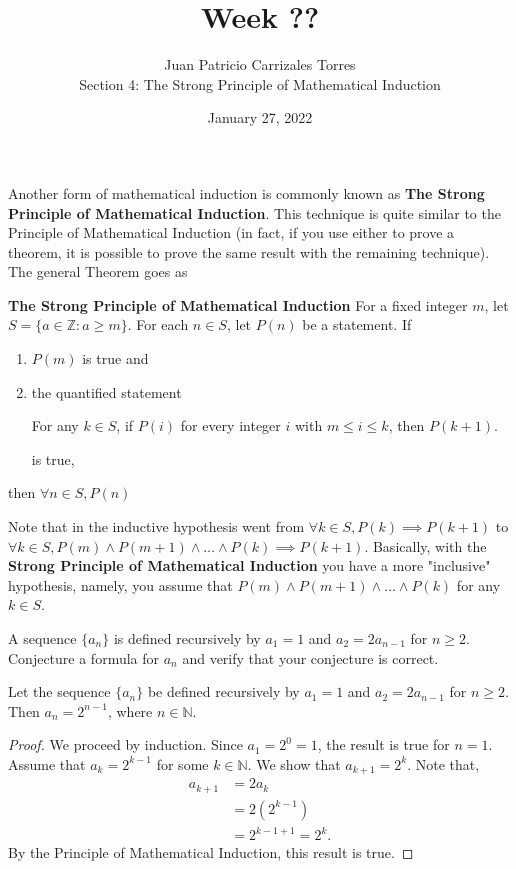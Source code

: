 \documentclass[12pt]{article}
\newcommand{\N}{\mathbb{N}}
\newcommand{\Z}{\mathbb{Z}}
\newenvironment{theorem}[2][Theorem]{\begin{trivlist}
		\item[\hskip \labelsep {\bfseries #1}\hskip \labelsep {\bfseries #2.}]}{\end{trivlist}}
\newenvironment{result}[2][Result]{\begin{trivlist}
			\item[\hskip \labelsep {\bfseries #1}\hskip \labelsep {\bfseries #2.}]}{\end{trivlist}}
\newenvironment{problem}[2][Problem]{\begin{trivlist}
		\item[\hskip \labelsep {\bfseries #1}\hskip \labelsep {\bfseries #2.}]}{\end{trivlist}}
\begin{document}
	
	\title{Week ??}
	\author{Juan Patricio Carrizales Torres \\
		Section 4: The Strong Principle of Mathematical Induction}
	\date{January 27, 2022}
	\maketitle 
	
	Another form of mathematical induction is commonly known as \textbf{The Strong Principle of Mathematical Induction}. This technique is quite similar to the Principle of Mathematical Induction (in fact, if you use either to prove a theorem, it is possible to prove the same result with the remaining technique). The general Theorem goes as
	\begin{theorem}{20}
		\textbf{The Strong Principle of Mathematical Induction} For a fixed integer $m$, let $S=\{a\in \Z:a\geq m\}$. For each $n\in S$, let $P(n)$ be a statement. If
		\begin{enumerate}
			\item $P(m)$ is true and
			\item the quantified statement 
			\begin{center}
			For any $k\in S$, if $P(i)$ for every integer $i$ with $m\leq i \leq k$, then $P(k+1)$. 
		\end{center}
			is true,
		\end{enumerate}
		then $\forall n\in S, P(n)$
	\end{theorem}
	Note that in the inductive hypothesis went from $\forall k\in S, P(k)\implies P(k+1)$ to $\forall k\in S, P(m)\wedge P(m+1)\wedge \ldots\wedge P(k)\implies P(k+1)$. Basically, with the \textbf{Strong Principle of Mathematical Induction} you have a more "inclusive" hypothesis, namely, you assume that $P(m)\wedge P(m+1)\wedge \ldots\wedge P(k)$ for any $k\in S$. 
	\begin{problem}{41}
		A sequence $\{a_{n}\}$ is defined recursively by $a_{1}=1$ and $a_{2} = 2a_{n-1}$ for $n\geq 2$. Conjecture a formula for $a_{n}$ and verify that your conjecture is correct.
		\begin{result}{}
			Let the sequence $\{a_{n}\}$ be defined recursively by $a_{1} = 1$ and $a_{2} = 2a_{n-1}$ for $n\geq 2$. Then $a_{n} = 2^{n-1}$, where $n\in \N$.
		\begin{proof}
			We proceed by induction. Since $a_{1} = 2^{0} = 1$, the result is true for $n=1$. Assume that $a_{k} = 2^{k-1}$ for some $k\in \N$. We show that $a_{k+1} = 2^{k} $. Note that,
			\begin{align*}
				a_{k+1} &= 2a_{k}\\
				&= 2(2^{k-1})\\
				&=  2^{k-1+1} = 2^{k}.
			\end{align*}
		By the Principle of Mathematical Induction, this result is true. 
		\end{proof}
		\end{result}
	\end{problem}
	
\end{document}
